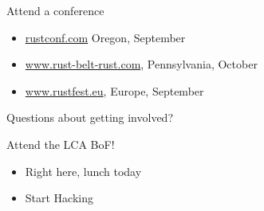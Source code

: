 \documentclass[50pt]{beamer}
\begin{document}
\begin{frame}
    Attend a conference
    \begin{itemize}
        \item \url{rustconf.com} Oregon, September
        \item \url{www.rust-belt-rust.com}, Pennsylvania, October
        \item \url{www.rustfest.eu}, Europe, September
    \end{itemize}
\end{frame}

\begin{frame}
    Questions about getting involved?
\end{frame}

\begin{frame}
    Attend the LCA BoF!
    \begin{itemize}
        \item Right here, lunch today
        \item Start Hacking
    \end{itemize}
\end{frame}
%
%
\end{document}
